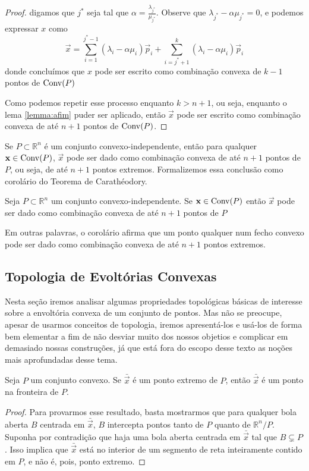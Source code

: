 \begin{thm:caratheodory}[Carathéodory]
\begin{proof}
		digamos que $j^*$ seja tal que $\alpha = \frac{\lambda_{j^*}}{\mu_{j^*}}$. Observe que
		$\lambda_{j^*} - \alpha \mu_{j^*} = 0$, e podemos expressar $x$ como
		\[\vec x = \displaystyle\sum_{i=1}^{j^* - 1} (\lambda_i - \alpha \mu_i)\vec p_i +
				\displaystyle\sum_{i=j^* + 1}^{k} (\lambda_i - \alpha \mu_i)\vec p_i\]
		donde concluímos que $x$ pode ser escrito como combinação convexa de $k - 1$ pontos de $\mathrm{Conv}(P)$

		Como podemos repetir esse processo enquanto $k > n + 1$, ou seja, enquanto o lema \ref{lemma:afim}
		puder ser aplicado, então $\vec x$ pode ser escrito como combinação convexa de até $n + 1$ pontos de $\mathrm{Conv}(P)$.
	\end{proof}
\end{thm:caratheodory}

Se $P \subset \mathbb{R}^n$ é um conjunto
convexo-independente, então para qualquer $\mathbf x \in \mathrm{Conv}(P)$, $\vec x$ pode ser dado
como combinação convexa de até $n+1$ pontos de $P$, ou seja, de até $n+1$ pontos extremos.
Formalizemos essa conclusão como corolário do Teorema de Carathéodory.

\begin{cor:caratheodory}
	Seja $P \subset \mathbb{R}^n$ um conjunto convexo-independente. Se $\mathbf x \in \mathrm{Conv}(P)$
	então $\vec x$ pode ser dado como combinação convexa de até $n + 1$ pontos de $P$
\end{cor:caratheodory}

Em outras palavras, o corolário afirma que um ponto qualquer num fecho convexo
pode ser dado como combinação convexa de até $n+1$ pontos extremos.

\subsection{Topologia de Evoltórias Convexas}

Nesta seção iremos analisar algumas propriedades topológicas básicas de
interesse sobre a envoltória convexa de um conjunto de pontos. Mas não se
preocupe, apesar de usarmos conceitos de topologia, iremos apresentá-los
e usá-los de forma bem elementar a fim de não desviar muito dos nossos
objetios e complicar em demasiado nossas construções, já que está fora do
escopo desse texto as noções mais aprofundadas desse tema.

\begin{prop:pontos extremos na fronteira}
Seja $P$ um conjunto convexo. Se $\bar{\vec{x}}$ é um ponto extremo de $P$,
então $\bar{\vec{x}}$ é um ponto na fronteira de $P$.

  \begin{proof}
    Para provarmos esse resultado, basta mostrarmos que para qualquer bola
    aberta $B$ centrada em $\bar{\vec{x}}$, $B$ intercepta pontos tanto de
    $P$ quanto de $\mathbb{R}^n / P$. Suponha por contradição que haja uma
    bola aberta centrada em $\bar{\vec{x}}$ tal que $B \subsetneq P$. Isso
    implica que $\bar{\vec{x}}$ está no interior de um segmento de reta
    inteiramente contido em $P$, e não é, pois, ponto extremo.
  \end{proof}
\end{prop:pontos extremos na fronteira}

